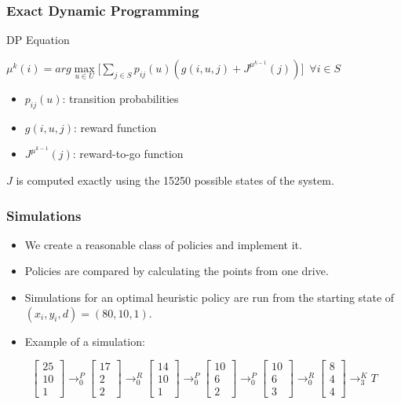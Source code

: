 \documentclass{beamer}
\begin{document}
\begin{frame}
\frametitle{Exact Dynamic Programming}
\begin{block}{DP Equation}
\begin{center}
$\mu^{k}(i) = arg\max\limits_{u \in U} \Big[ \sum\limits_{j \in S} p_{ij}(u)(g(i,u,j) +  J^{\mu^{k-1}}(j))\Big] \, \, \, \forall i \in S$
\end{center}
\end{block}
\begin{itemize}
\item $p_{ij}(u)$: transition probabilities
\item $g(i,u,j)$: reward function
\item $J^{\mu^{k-1}}(j)$: reward-to-go function
\end{itemize}
$J$ is computed exactly using the 15250 possible states of the system.
\end{frame}

\begin{frame}
\frametitle{Simulations}
\begin{itemize}
\item We create a reasonable class of policies and implement it. 
\item Policies are compared by calculating the points from one drive.
\item Simulations for an optimal heuristic policy are run from the starting state of $(x_{i},y_{i},d) = (80, 10, 1)$.
\item Example of a simulation:
\end{itemize}
$$
\begin{bmatrix} 25\\[0.3em] 10 \\[0.3em] 1 \end{bmatrix}
\longrightarrow_0^P
\begin{bmatrix} 17\\[0.3em] 2 \\[0.3em] 2 \end{bmatrix}
\longrightarrow_0^R
\begin{bmatrix} 14\\[0.3em] 10 \\[0.3em] 1 \end{bmatrix}
\longrightarrow_0^P
\begin{bmatrix} 10\\[0.3em] 6 \\[0.3em] 2 \end{bmatrix}
\longrightarrow_0^P
\begin{bmatrix} 10\\[0.3em] 6 \\[0.3em] 3 \end{bmatrix}
\longrightarrow_0^R
\begin{bmatrix} 8\\[0.3em] 4 \\[0.3em] 4 \end{bmatrix}
\longrightarrow_3^K
T
$$
\end{frame}
\end{document}
